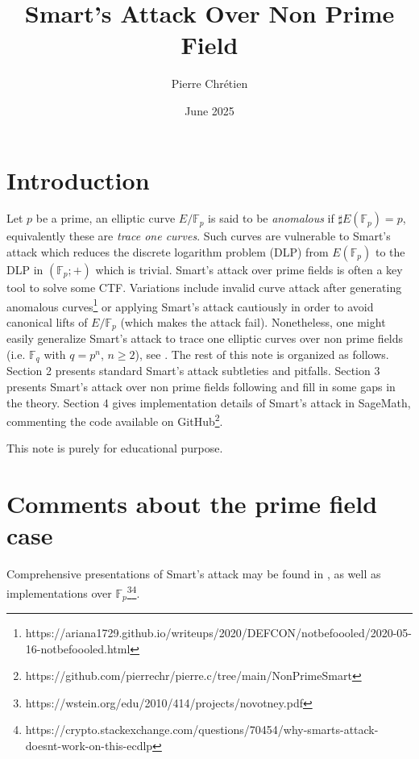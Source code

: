 \documentclass[10pt]{article}
\theoremstyle{definition}
\newcommand{\F}{\mathbb{F}}
\begin{document}

\author{Pierre Chrétien}
\title{Smart's Attack Over Non Prime Field}
\date{June 2025}
\maketitle


\section{Introduction}


Let $p$ be a prime, an elliptic curve $E/\F_p$ is said to be \textsl{anomalous} if $\sharp E(\F_p) = p$, equivalently these are \textsl{trace one curves}.
Such curves are vulnerable to Smart's attack  \cite{Sma99} which reduces the discrete logarithm problem (DLP) from $E(\F_p)$ to the DLP in $(\F_p;+)$ which is trivial.
Smart's attack over prime fields is often a key tool to solve some CTF.
Variations include invalid curve attack after generating anomalous curves\footnote{https://ariana1729.github.io/writeups/2020/DEFCON/notbefoooled/2020-05-16-notbefoooled.html} or applying Smart's attack cautiously in order to avoid canonical lifts of $E/\F_p$ (which makes the attack fail).
Nonetheless, one might easily generalize Smart's attack to trace one elliptic curves over non prime fields (i.e. $\F_q$ with $q = p^n$, $n \geq 2$), see \cite{Hofman}.
The rest of this note is organized as follows.
Section 2 presents standard Smart's attack subtleties and pitfalls.
Section 3 presents Smart's attack over non prime fields following \cite{Hofman} and fill in some gaps in the theory.
Section 4 gives implementation details of Smart's attack in SageMath, commenting the code available on GitHub\footnote{https://github.com/pierrechr/pierre.c/tree/main/NonPrimeSmart}.

This note is purely for educational purpose.

\section{Comments about the prime field case}

Comprehensive presentations of Smart's attack may be found in \cite{Hofman}, \cite{LEPREVOST2005225} as well as implementations over $\F_p$\footnote{https://wstein.org/edu/2010/414/projects/novotney.pdf}\footnote{https://crypto.stackexchange.com/questions/70454/why-smarts-attack-doesnt-work-on-this-ecdlp}.
\end{document}
